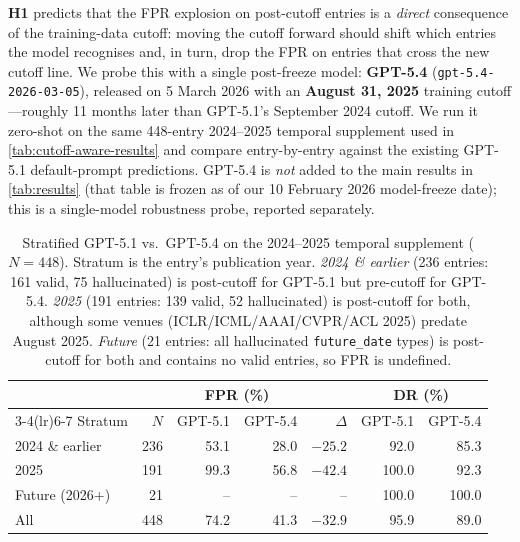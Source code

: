\textbf{H1} predicts that the FPR explosion on post-cutoff entries is a \emph{direct} consequence of the training-data cutoff: moving the cutoff forward should shift which entries the model recognises and, in turn, drop the FPR on entries that cross the new cutoff line.
We probe this with a single post-freeze model: \textbf{GPT-5.4} (\texttt{gpt-5.4-2026-03-05}), released on 5 March 2026 with an \textbf{August 31, 2025} training cutoff---roughly 11 months later than GPT-5.1's September 2024 cutoff.
We run it zero-shot on the same 448-entry 2024--2025 temporal supplement used in \cref{tab:cutoff-aware-results} and compare entry-by-entry against the existing GPT-5.1 default-prompt predictions.
GPT-5.4 is \emph{not} added to the main results in \cref{tab:results} (that table is frozen as of our 10 February 2026 model-freeze date); this is a single-model robustness probe, reported separately.

\begin{table}[h]
\centering
\small
\caption{Stratified GPT-5.1 vs.\ GPT-5.4 on the 2024--2025 temporal supplement ($N{=}448$). Stratum is the entry's publication year. \emph{2024 \& earlier} (236 entries: 161 valid, 75 hallucinated) is post-cutoff for GPT-5.1 but pre-cutoff for GPT-5.4. \emph{2025} (191 entries: 139 valid, 52 hallucinated) is post-cutoff for both, although some venues (ICLR/ICML/AAAI/CVPR/ACL 2025) predate August 2025. \emph{Future} (21 entries: all hallucinated \texttt{future\_date} types) is post-cutoff for both and contains no valid entries, so FPR is undefined.}
\label{tab:gpt54-probe}
\begin{tabular}{lrrrrrr}
\toprule
 & & \multicolumn{2}{c}{\textbf{FPR (\%)}} & & \multicolumn{2}{c}{\textbf{DR (\%)}} \\
\cmidrule(lr){3-4}\cmidrule(lr){6-7}
Stratum & $N$ & GPT-5.1 & GPT-5.4 & $\Delta$ & GPT-5.1 & GPT-5.4 \\
\midrule
2024 \& earlier  & 236 & 53.1 & 28.0 & $-25.2$ & 92.0 & 85.3 \\
2025             & 191 & 99.3 & 56.8 & $-42.4$ & 100.0 & 92.3 \\
Future (2026+)   &  21 & --   & --   & --      & 100.0 & 100.0 \\
\midrule
All              & 448 & 74.2 & 41.3 & $-32.9$ &  95.9 &  89.0 \\
\bottomrule
\end{tabular}
\end{table}

